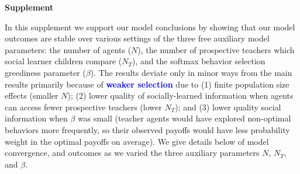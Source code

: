 \documentclass[letterpaper,11.5pt]{scrartcl}
\newcommand{\ps}[1]{{\textcolor{mygreen} {({\tiny PS:} #1)}}}
\newcommand{\edit}[1]{{\bfseries \textcolor{blue} {#1}}}
\begin{document}
\pagebreak
\begin{center}
  \textbf{\Large \textsf{Supplement}}
\end{center}
\setcounter{equation}{1}
\setcounter{figure}{0}
\setcounter{section}{0}
\setcounter{table}{0}
\setcounter{page}{1}
\makeatletter
\renewcommand{\theequation}{S\arabic{equation}}
\renewcommand{\thefigure}{S\arabic{figure}}
\renewcommand{\thetable}{S\arabic{table}}
\renewcommand{\thesection}{S\arabic{section}}
\renewcommand{\thepage}{S\arabic{page}}









In this supplement we support our model conclusions by showing that our model
outcomes are stable over various settings of the three free auxiliary model
parameters: the number of agents ($N$), the number of
prospective teachers which social learner children compare
($N_T$), and the softmax behavior selection greediness parameter ($\beta$).
The results deviate only in minor ways from the main results primarily because of
\edit{weaker selection}
due to (1) finite population size effects (smaller $N$);
(2) lower quality of socially-learned information when agents can access fewer
prospective teachers (lower $N_T$); and (3) lower quality social information when $\beta$
was small (teacher agents would have explored non-optimal behaviors more
frequently, so their observed payoffs would have less probability weight in
the optimal payoffs on average). We give details below of model convergence, and
outcomes as we varied the three auxiliary parameters $N$, $N_T$, and $\beta$.
\end{document}
